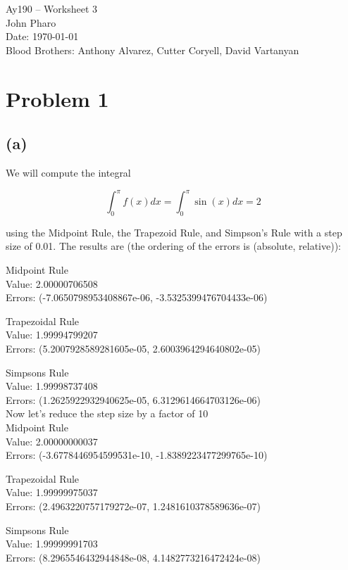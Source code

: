 \documentclass[11pt,letterpaper]{article}
\begin{document}
\begin{center}
\Large
Ay190 -- Worksheet 3\\
John Pharo\\
Date: \today \\
Blood Brothers: Anthony Alvarez, Cutter Coryell, David Vartanyan
\end{center}

\section*{Problem 1}

\subsection*{(a)}

We will compute the integral

$$ \int_0^{\pi} f(x) dx = \int_0^{\pi} \sin(x) dx = 2 $$

using the Midpoint Rule, the Trapezoid Rule, and Simpson's Rule with a step size of 0.01. The results are (the ordering of the errors is (absolute, relative)):

Midpoint Rule \\
Value: 2.00000706508 \\
Errors: (-7.0650798953408867e-06, -3.5325399476704433e-06)

Trapezoidal Rule \\
Value: 1.99994799207 \\
Errors: (5.2007928589281605e-05, 2.6003964294640802e-05)

Simpsons Rule \\
Value: 1.99998737408 \\
Errors: (1.2625922932940625e-05, 6.3129614664703126e-06) \\

Now let's reduce the step size by a factor of 10 \\

Midpoint Rule \\
Value: 2.00000000037 \\
Errors: (-3.6778446954599531e-10, -1.8389223477299765e-10)

Trapezoidal Rule \\
Value: 1.99999975037 \\
Errors: (2.4963220757179272e-07, 1.2481610378589636e-07)

Simpsons Rule \\
Value: 1.99999991703 \\
Errors: (8.2965546432944848e-08, 4.1482773216472424e-08) \\
\end{document}
